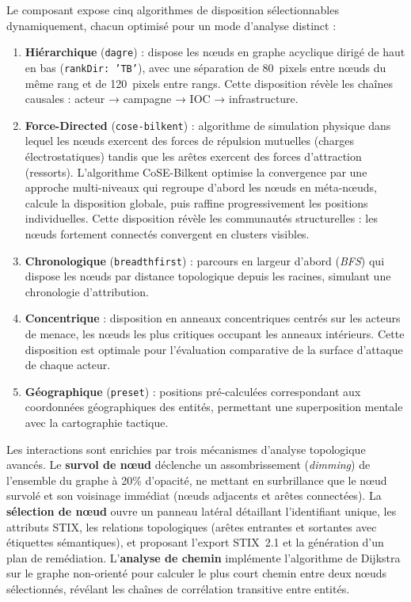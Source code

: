 Le composant expose cinq algorithmes de disposition sélectionnables dynamiquement, chacun optimisé pour un mode d'analyse distinct :

\begin{enumerate}
    \item \textbf{Hiérarchique} (\texttt{dagre}) : dispose les nœuds en graphe acyclique dirigé de haut en bas (\texttt{rankDir: 'TB'}), avec une séparation de 80~pixels entre nœuds du même rang et de 120~pixels entre rangs. Cette disposition révèle les chaînes causales : acteur → campagne → IOC → infrastructure.
    \item \textbf{Force-Directed} (\texttt{cose-bilkent}) : algorithme de simulation physique dans lequel les nœuds exercent des forces de répulsion mutuelles (charges électrostatiques) tandis que les arêtes exercent des forces d'attraction (ressorts). L'algorithme CoSE-Bilkent optimise la convergence par une approche multi-niveaux qui regroupe d'abord les nœuds en méta-nœuds, calcule la disposition globale, puis raffine progressivement les positions individuelles. Cette disposition révèle les communautés structurelles : les nœuds fortement connectés convergent en clusters visibles.
    \item \textbf{Chronologique} (\texttt{breadthfirst}) : parcours en largeur d'abord (\textit{BFS}) qui dispose les nœuds par distance topologique depuis les racines, simulant une chronologie d'attribution.
    \item \textbf{Concentrique} : disposition en anneaux concentriques centrés sur les acteurs de menace, les nœuds les plus critiques occupant les anneaux intérieurs. Cette disposition est optimale pour l'évaluation comparative de la surface d'attaque de chaque acteur.
    \item \textbf{Géographique} (\texttt{preset}) : positions pré-calculées correspondant aux coordonnées géographiques des entités, permettant une superposition mentale avec la cartographie tactique.
\end{enumerate}

Les interactions sont enrichies par trois mécanismes d'analyse topologique avancés. Le \textbf{survol de nœud} déclenche un assombrissement (\textit{dimming}) de l'ensemble du graphe à 20\% d'opacité, ne mettant en surbrillance que le nœud survolé et son voisinage immédiat (nœuds adjacents et arêtes connectées). La \textbf{sélection de nœud} ouvre un panneau latéral détaillant l'identifiant unique, les attributs STIX, les relations topologiques (arêtes entrantes et sortantes avec étiquettes sémantiques), et proposant l'export STIX~2.1 et la génération d'un plan de remédiation. L'\textbf{analyse de chemin} implémente l'algorithme de Dijkstra sur le graphe non-orienté pour calculer le plus court chemin entre deux nœuds sélectionnés, révélant les chaînes de corrélation transitive entre entités.

